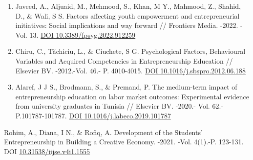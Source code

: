 \begin{enumerate}
\def\labelenumi{\arabic{enumi}.}
\item
  Javeed, A., Aljuaid, M., Mehmood, S., Khan, M Y., Mahmood, Z., Shahid,
  D., \& Wali, S S. Factors affecting youth empowerment and
  entrepreneurial initiatives: Social implications and way forward //
  Frontiers Media. -2022. -Vol. 13.
  \href{https://doi.org/10.3389/fpsyg.2022.912259}{DOI
  10.3389/fpsyg.2022.912259}
\item
  Chiru, C., Tăchiciu, L., \& Ciuchete, S G. Psychological Factors,
  Behavioural Variables and Acquired Competencies in Entrepreneurship
  Education // Elsevier BV. -2012.-Vol. 46.- P. 4010-4015.
  \href{https://doi.org/10.1016/j.sbspro.2012.06.188}{DOI
  10.1016/j.sbspro.2012.06.188}
\item
  Alaref, J J S., Brodmann, S., \& Premand, P. The medium-term impact of
  entrepreneurship education on labor market outcomes: Experimental
  evidence from university graduates in Tunisia // Elsevier BV. -2020.-
  Vol. 62.- P.101787-101787.
  \href{https://doi.org/10.1016/j.labeco.2019.101787}{DOI
  10.1016/j.labeco.2019.101787}
\end{enumerate}

Rohim, A., Diana, I N., \& Rofiq, A. Development of the Students'
Entrepreneurship in Building a Creative Economy. -2021. -Vol. 4(1).-P.
123-131. DOI
\href{https://doi.org/10.31538/iijse.v4i1.1555}{10.31538/iijse.v4i1.1555}

